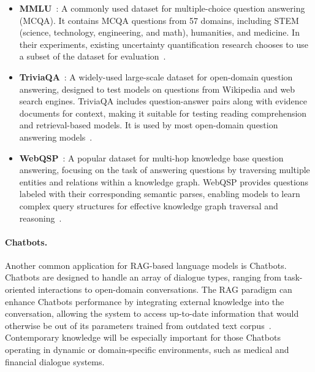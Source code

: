 \begin{itemize}
    \item \textbf{MMLU}~\cite{hendrycks2021measuringmassivemultitasklanguage}: A commonly used dataset for multiple-choice question answering (MCQA). It contains MCQA questions from 57 domains, including STEM (science, technology, engineering, and math), humanities, and medicine. In their experiments, existing uncertainty quantification research chooses to use a subset of the dataset for evaluation~\cite{ye2024benchmarkingllmsuncertaintyquantification, kumar2023conformalpredictionlargelanguage}.
    
    \item \textbf{TriviaQA}~\cite{joshi2017triviaqalargescaledistantly}: A widely-used large-scale dataset for open-domain question answering, designed to test models on questions from Wikipedia and web search engines. TriviaQA includes question-answer pairs along with evidence documents for context, making it suitable for testing reading comprehension and retrieval-based models. It is used by most open-domain question answering models~\cite{su2024apienoughconformalprediction, quach2024conformallanguagemodeling, li2023traq}.

    \item \textbf{WebQSP}~\cite{yih2016value}: A popular dataset for multi-hop knowledge base question answering, focusing on the task of answering questions by traversing multiple entities and relations within a knowledge graph. WebQSP provides questions labeled with their corresponding semantic parses, enabling models to learn complex query structures for effective knowledge graph traversal and reasoning~\cite{ni2024trustworthyknowledgegraphreasoning, luo2024rog, sun2023thinkongraph}. 
\end{itemize}


\paragraph{Chatbots.} Another common application for RAG-based language models
is Chatbots. Chatbots are designed to handle an array of dialogue types, ranging
from task-oriented interactions to open-domain conversations. The RAG paradigm
can enhance Chatbots performance by integrating external knowledge into the
conversation, allowing the
system to access up-to-date information that would otherwise be out of its
parameters trained from outdated text corpus~\cite{akkiraju2024factsbuildingretrievalaugmented, sumida2024ragchatbotsforgetunimportant, feldman2024raggededgesdoubleedgedsword}. Contemporary knowledge will be especially important
for those Chatbots operating in dynamic or domain-specific environments, such as
medical and financial dialogue systems.

